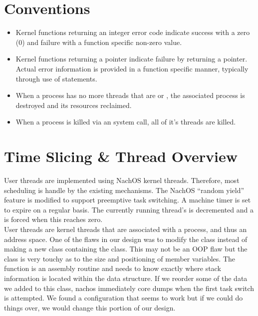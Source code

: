   \section{Conventions}
    \begin{itemize}
      \item Kernel functions returning an integer error code indicate success
      with a zero (0) and failure with a function specific non-zero value.

      \item Kernel functions returning a pointer indicate failure by returning
      a  pointer. Actual error information is provided in a function
      specific manner, typically through use of  statements.

      \item When a process has no more threads that are  or
      , the associated process is destroyed and its resources reclaimed.

      \item When a process is killed via an  system call, all of it's
      threads are killed.
    \end{itemize}
  
  \section{Time Slicing \& Thread Overview}
    User threads are implemented using NachOS kernel threads. Therefore, most
    scheduling is handle by the existing mechanisms. The NachOS ``random
    yield'' feature is modified to support preemptive task switching. A machine
    timer is set to expire on a regular basis. The currently running thread's
     is decremented and a  is forced when this 
    reaches zero.\\

    User threads are kernel threads that are associated with a process, and thus an
    address space. One of the flaws in our design was to modify the  class
    instead of making a new class containing the  class. This may not be an
    OOP flaw but the  class is very touchy as to the size and positioning of
    member variables. The  function is an assembly routine and needs to
    know exactly where stack information is located within the data structure. If we
    reorder some of the data we added to this class, nachos immediately core dumps when
    the first task switch is attempted. We found a configuration that seems to work but
    if we could do things over, we would change this portion of our design.\\

